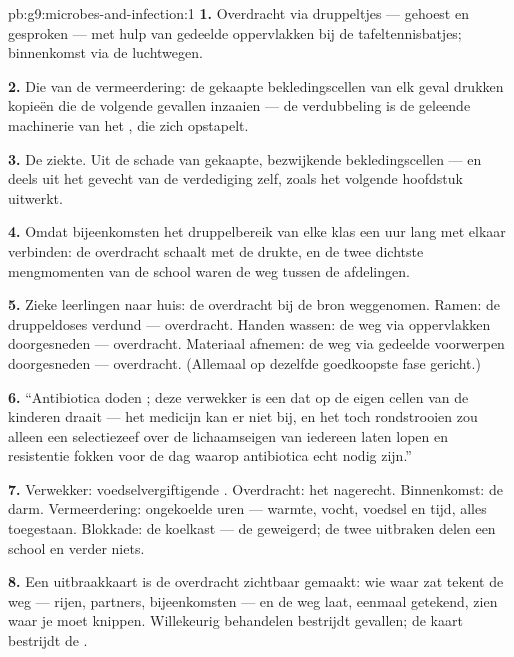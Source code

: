 \begin{solution}{pb:g9:microbes-and-infection:1}
\textbf{1.} Overdracht via druppeltjes --- gehoest en gesproken ---
met hulp van gedeelde oppervlakken bij de tafeltennisbatjes;
binnenkomst via de luchtwegen.

\textbf{2.} Die van de vermeerdering: de gekaapte bekledingscellen
van elk geval drukken kopieën die de volgende gevallen inzaaien ---
de verdubbeling is de geleende machinerie van het , die zich
opstapelt.

\textbf{3.} De ziekte. Uit de schade van gekaapte, bezwijkende
bekledingscellen --- en deels uit het gevecht van de verdediging
zelf, zoals het volgende hoofdstuk uitwerkt.

\textbf{4.} Omdat bijeenkomsten het druppelbereik van elke klas een
uur lang met elkaar verbinden: de overdracht schaalt met de
drukte, en de twee dichtste mengmomenten van de school waren de weg
tussen de afdelingen.

\textbf{5.} Zieke leerlingen naar huis: de overdracht bij de bron
weggenomen. Ramen: de druppeldoses verdund --- overdracht. Handen
wassen: de weg via oppervlakken doorgesneden --- overdracht.
Materiaal afnemen: de weg via gedeelde voorwerpen doorgesneden ---
overdracht. (Allemaal op dezelfde goedkoopste fase gericht.)

\textbf{6.} ``Antibiotica doden ; deze verwekker is een
 dat op de eigen cellen van de kinderen draait --- het
medicijn kan er niet bij, en het toch rondstrooien zou alleen een
selectiezeef over de lichaamseigen  van iedereen laten
lopen en resistentie fokken voor de dag waarop antibiotica echt
nodig zijn.''

\textbf{7.} Verwekker: voedselvergiftigende . Overdracht:
het nagerecht. Binnenkomst: de darm. Vermeerdering: ongekoelde uren
--- warmte, vocht, voedsel en tijd, alles toegestaan. Blokkade: de
koelkast --- de  geweigerd; de twee uitbraken delen
een school en verder niets.

\textbf{8.} Een uitbraakkaart is de overdracht zichtbaar gemaakt:
wie waar zat tekent de weg --- rijen, partners, bijeenkomsten ---
en de weg laat, eenmaal getekend, zien waar je moet knippen.
Willekeurig behandelen bestrijdt gevallen; de kaart bestrijdt de
.


\end{solution}
